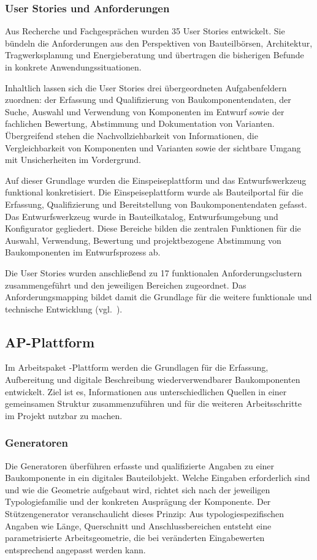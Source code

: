 \documentclass[type=zwischenbericht]{zukunftbau}
\begin{document}
\subsubsection{User Stories und Anforderungen}
Aus Recherche und Fachgesprächen wurden 35 User Stories entwickelt. Sie bündeln die Anforderungen aus den Perspektiven von Bauteilbörsen, Architektur, Tragwerksplanung und Energieberatung und übertragen die bisherigen Befunde in konkrete Anwendungssituationen.

Inhaltlich lassen sich die User Stories drei übergeordneten Aufgabenfeldern zuordnen: der Erfassung und Qualifizierung von Baukomponentendaten, der Suche, Auswahl und Verwendung von Komponenten im Entwurf sowie der fachlichen Bewertung, Abstimmung und Dokumentation von Varianten. Übergreifend stehen die Nachvollziehbarkeit von Informationen, die Vergleichbarkeit von Komponenten und Varianten sowie der sichtbare Umgang mit Unsicherheiten im Vordergrund.

Auf dieser Grundlage wurden die Einspeiseplattform und das Entwurfswerkzeug funktional konkretisiert. Die Einspeiseplattform wurde als Bauteilportal für die Erfassung, Qualifizierung und Bereitstellung von Baukomponentendaten gefasst. Das Entwurfswerkzeug wurde in Bauteilkatalog, Entwurfsumgebung und Konfigurator gegliedert. Diese Bereiche bilden die zentralen Funktionen für die Auswahl, Verwendung, Bewertung und projektbezogene Abstimmung von Baukomponenten im Entwurfsprozess ab.

Die User Stories wurden anschließend zu 17 funktionalen Anforderungsclustern zusammengeführt und den jeweiligen Bereichen zugeordnet. Das Anforderungsmapping bildet damit die Grundlage für die weitere funktionale und technische Entwicklung (vgl.\ ).

\subsection{AP-Plattform}

Im Arbeitspaket -Plattform werden die Grundlagen für die Erfassung, Aufbereitung und digitale Beschreibung wiederverwendbarer Baukomponenten entwickelt. Ziel ist es, Informationen aus unterschiedlichen Quellen in einer gemeinsamen Struktur zusammenzuführen und für die weiteren Arbeitsschritte im Projekt nutzbar zu machen.

\subsubsection{Generatoren}
Die Generatoren überführen erfasste und qualifizierte Angaben zu einer Baukomponente in ein digitales Bauteilobjekt. Welche Eingaben erforderlich sind und wie die Geometrie aufgebaut wird, richtet sich nach der jeweiligen Typologiefamilie und der konkreten Ausprägung der Komponente. Der Stützengenerator veranschaulicht dieses Prinzip: Aus typologiespezifischen Angaben wie Länge, Querschnitt und Anschlussbereichen entsteht eine parametrisierte Arbeitsgeometrie, die bei veränderten Eingabewerten entsprechend angepasst werden kann.
\end{document}
